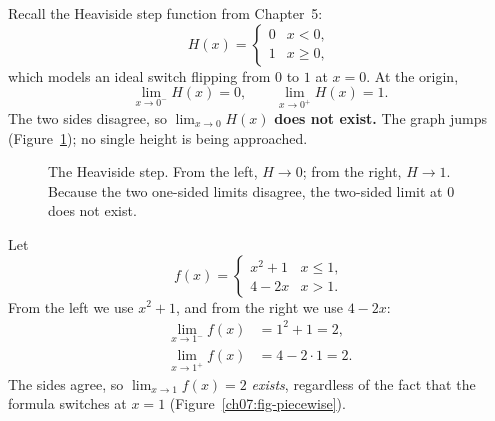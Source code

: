 \begin{example}
\label{ch07:ex-jump}
Recall the Heaviside step function from Chapter~5:
\[
  H(x) = \begin{cases} 0 & x < 0,\\ 1 & x \ge 0,\end{cases}
\]
which models an ideal switch flipping from $0$ to $1$ at $x=0$. At the origin,
\[
  \lim_{x\to 0^{-}} H(x) = 0,
  \qquad
  \lim_{x\to 0^{+}} H(x) = 1.
\]
The two sides disagree, so $\lim_{x\to 0} H(x)$ \textbf{does not
exist.} The graph jumps (Figure~\ref{ch07:fig-heaviside}); no single height is being approached.
\end{example}

\begin{figure}[htbp]
\centering
{}
\caption{The Heaviside step. From the left, $H\to 0$; from the right,
$H\to 1$. Because the two one-sided limits disagree, the two-sided limit at
$0$ does not exist.}
\label{ch07:fig-heaviside}
\end{figure}

\begin{example}
\label{ch07:ex-piecewise}
Let
\[
  f(x) = \begin{cases} x^{2}+1 & x \le 1,\\ 4 - 2x & x > 1.\end{cases}
\]
From the left we use $x^2+1$, and from the right we use $4-2x$:
\begin{align*}
  \lim_{x\to 1^{-}} f(x) &= 1^2+1 = 2,\\
  \lim_{x\to 1^{+}} f(x) &= 4-2\cdot 1 = 2.
\end{align*}
The sides agree, so $\lim_{x\to 1} f(x) = 2$ \emph{exists},
regardless of the fact that the formula switches at $x=1$
(Figure~\ref{ch07:fig-piecewise}).
\end{example}

